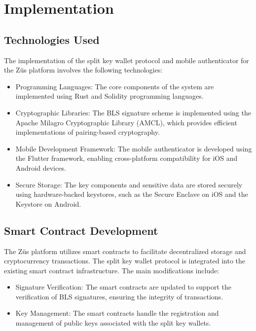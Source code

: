 \chapter{Implementation}

\section{Technologies Used}
The implementation of the split key wallet protocol and mobile authenticator for the Züs platform involves the following technologies:
\begin{itemize}
    \item Programming Languages: The core components of the system are implemented using Rust and Solidity programming languages.
    \item Cryptographic Libraries: The BLS signature scheme is implemented using the Apache Milagro Cryptographic Library (AMCL), which provides efficient implementations of pairing-based cryptography.
    \item Mobile Development Framework: The mobile authenticator is developed using the Flutter framework, enabling cross-platform compatibility for iOS and Android devices.
    \item Secure Storage: The key components and sensitive data are stored securely using hardware-backed keystores, such as the Secure Enclave on iOS and the Keystore on Android.
\end{itemize}

\section{Smart Contract Development}
The Züs platform utilizes smart contracts to facilitate decentralized storage and cryptocurrency transactions. The split key wallet protocol is integrated into the existing smart contract infrastructure. The main modifications include:
\begin{itemize}
    \item Signature Verification: The smart contracts are updated to support the verification of BLS signatures, ensuring the integrity of transactions.
    \item Key Management: The smart contracts handle the registration and management of public keys associated with the split key wallets.
\end{itemize}

